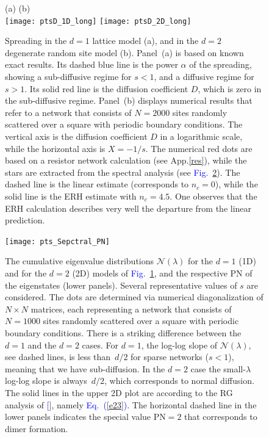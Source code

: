 \documentclass[aps,pre,floats,floatfix,twocolumn]{revtex4}
\newcommand{\Eq}[1]{\textcolor{blue}{Eq.\!\!~(\ref{#1})}}
\newcommand{\Fig}[1]{\textcolor{blue}{Fig.}\!\!~\ref{#1}}
\renewcommand{\cite}[1]{\textcolor{blue}{[\onlinecite{#1}}]} %
\begin{document}
 
\clearpage


\onecolumngrid


\begin{figure}[h!]
(a) \hspace{0.5\hsize} (b) \\
\texttt{[image: ptsD\_1D\_long]}
\texttt{[image: ptsD\_2D\_long]}

\caption{Spreading in the $d{=}1$ lattice model (a), 
and in the $d{=}2$ degenerate random site model (b). 
Panel~(a) is based on known exact results.   
Its dashed blue line is the power $\alpha$ of the spreading,  
showing a sub-diffusive regime for $s<1$, and a diffusive regime for $s>1$. 
Its solid red line is the diffusion coefficient $D$, 
which is zero in the sub-diffusive regime. 
%
Panel~(b) displays numerical results that refer 
to a network that consists of ${N=2000}$ sites 
randomly scattered over a square with periodic boundary conditions.
%
The vertical axis is the diffusion coefficient $D$ 
in a logarithmic scale, while the horizontal axis is $X=-1/s$. 
The numerical red dots are based on a resistor network calculation (see App.\ref{res}), 
while the stars are extracted from the spectral analysis (see \Fig{f2}).  
The dashed line is the linear estimate (corresponds to ${n_c = 0}$), 
while the solid line is the ERH estimate with ${n_c = 4.5}$.
One observes that the ERH calculation describes very well 
the departure from the linear prediction.
}
\label{f1}
\end{figure}



\begin{figure}[h!]
\texttt{[image: pts\_Sepctral\_PN]}

\caption{ 
The cumulative eigenvalue distributions $\mathcal{N}(\lambda)$ 
for the $d{=}1$ (1D) and for the $d{=}2$ (2D) models of \Fig{f1}, 
and the respective PN of the eigenstates (lower panels).
Several representative values of $s$ are considered.
% 
The dots are determined via numerical diagonalization of $N \times N$ matrices,  
each representing a network that consists of ${N=1000}$ sites 
randomly scattered over a square with periodic boundary conditions.
%
There is a striking difference between the $d{=}1$ and the $d{=}2$ cases. 
For $d{=}1$, the log-log slope of $\mathcal{N}(\lambda)$, 
see dashed lines, is less than~$d/2$ for sparse networks ($s<1$), 
meaning that we have sub-diffusion. 
In the $d{=}2$ case the small-$\lambda$ log-log slope 
is always~$d/2$, which corresponds to normal diffusion.
%  
The solid lines in the upper 2D plot are according 
to the RG analysis of \cite{amir}, namely \Eq{e23}. 
%
The horizontal dashed line in the lower panels indicates 
the special value PN$=2$ that corresponds to dimer formation.
} 
\label{f2}
\end{figure}
\end{document}
